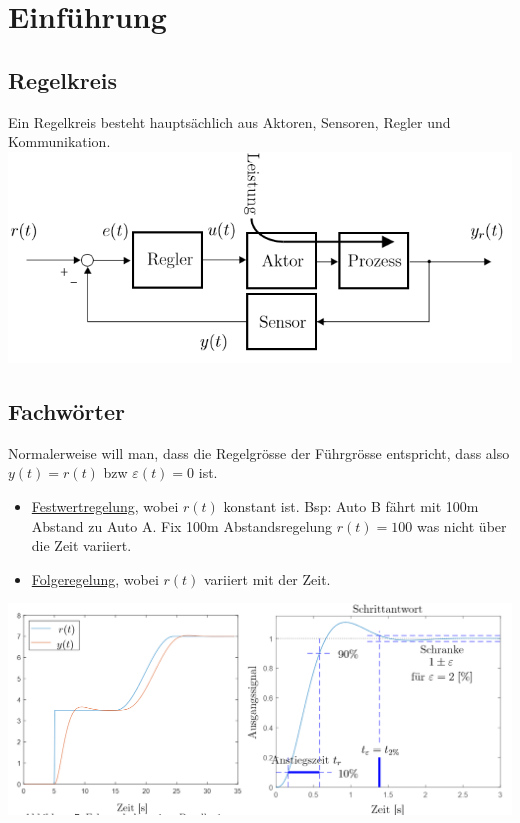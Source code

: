 \section{Einführung}
\subsection{Regelkreis} 
Ein Regelkreis besteht hauptsächlich aus Aktoren, Sensoren, Regler und Kommunikation.\\
\includegraphics[width=\columnwidth]{Images/regelkreis_bsp}

\subsection{Fachwörter}
Normalerweise will man, dass die Regelgrösse der Führgrösse entspricht, dass also $y(t) = r(t)$ bzw $\varepsilon(t) = 0$ ist.
\begin{itemize}[nosep]
	\item\underline{Festwertregelung}, wobei $r(t)$ konstant ist. Bsp: Auto B fährt mit 100m Abstand zu Auto A. Fix 100m Abstandsregelung $r(t) = 100$ was nicht über die Zeit variiert.
	\item\underline{Folgeregelung}, wobei $r(t)$ variiert mit der Zeit.
\end{itemize}
\includegraphics[width=\linewidth]{Images/regelkreis}

